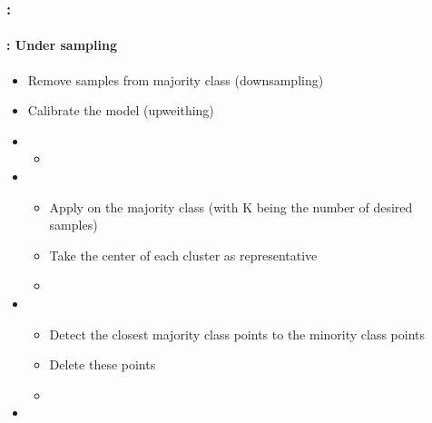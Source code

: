 \documentclass[xcolor=table]{beamer}
\begin{document}
\begin{frame}
	\frametitle{\insertshortsubtitle: \insertsection}
	\framesubtitle{\insertsubsection: Under sampling}
	
	\begin{itemize}
		\item Remove samples from majority class (downsampling)
		\item Calibrate the model (upweithing)
		\item {}
		\begin{itemize}
			\item {}
		\end{itemize}
		\item {}
		\begin{itemize}
			\item Apply  on the majority class (with K being the number of desired samples)
			\item Take the center of each cluster as representative
			\item {}
		\end{itemize}
		\item {}
		\begin{itemize}
			\item Detect the closest majority class points to the minority class points
			\item Delete these points
			\item {}
		\end{itemize}
		\item {}
	\end{itemize}
	
\end{frame}
\end{document}
